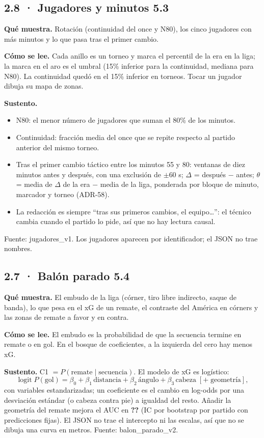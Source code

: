 \documentclass[11pt,a4paper]{article}
\newcommand{\cifraDauc}{\textbf{??}}\newcommand{\cifraViajan}{\textbf{??}}%
\newcommand{\fuente}[1]{{\small\ttfamily #1}}
\newcommand{\bloque}[3]{\par\textbf{Qué muestra.} #1\par\textbf{Cómo se lee.} #2\par\textbf{Sustento.} #3\par}
\begin{document}
\subsection*{2.8 · Jugadores y minutos \hfill{\normalfont\small 5.3}}
\bloque{Rotación (continuidad del once y N80), los cinco jugadores con más
minutos y lo que pasa tras el primer cambio.}
{Cada anillo es un torneo y marca el percentil de la era en la liga; la marca
en el aro es el umbral (15\% inferior para la continuidad, mediana para N80).
La continuidad quedó en el 15\% inferior en \cifraRotJ{} torneos. Tocar un
jugador dibuja su mapa de zonas.}
{\begin{itemize}
\item N80: el menor número de jugadores que suman el 80\% de los minutos.
\item Continuidad: fracción media del once que se repite respecto al partido
  anterior del mismo torneo.
\item Tras el primer cambio táctico entre los minutos 55 y 80: ventanas de diez
  minutos antes y después, con una exclusión de $\pm$60 s; $\Delta$ = después
  $-$ antes; $\theta$ = media de $\Delta$ de la era $-$ media de la liga,
  ponderada por bloque de minuto, marcador y torneo (ADR-58).
\item La redacción es siempre ``tras sus primeros cambios, el equipo\ldots'': el
  técnico cambia cuando el partido lo pide, así que no hay lectura causal.
\end{itemize}
Fuente: \fuente{jugadores\_v1}. Los jugadores aparecen por identificador; el
JSON no trae nombres.}

\subsection*{2.7 · Balón parado \hfill{\normalfont\small 5.4}}
\bloque{El embudo de la liga (córner, tiro libre indirecto, saque de banda), lo
que pesa en el xG de un remate, el contraste del América en córners y las zonas
de remate a favor y en contra.}
{El embudo es la probabilidad de que la secuencia termine en remate o en gol.
En el bosque de coeficientes, a la izquierda del cero hay menos xG.}
{C1 $=P(\text{remate}\mid\text{secuencia})$. El modelo de xG es logístico:
\[
\operatorname{logit} P(\text{gol}) = \beta_0 + \beta_1\,\text{distancia} + \beta_2\,\text{ángulo} + \beta_3\,\text{cabeza} \;[+\;\text{geometría}],
\]
con variables estandarizadas; un coeficiente es el cambio en log-odds por una
desviación estándar (o cabeza contra pie) a igualdad del resto. Añadir la
geometría del remate mejora el AUC en \cifraDauc{} (IC por bootstrap por
partido con predicciones fijas). El JSON no trae el intercepto ni las escalas,
así que no se dibuja una curva en metros. Fuente: \fuente{balon\_parado\_v2}.}
\end{document}
